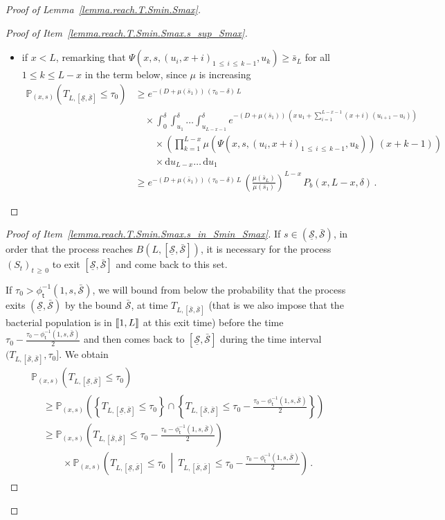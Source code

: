 \documentclass[AHL,Unicode,longabstracts,published]{cedram}
\newcommand{\llbracket}{\mathopen{[\mkern -2.7mu[}}
\newcommand{\rrbracket}{\mathclose{]\mkern -2.7mu]}}
\newcommand{\PP}{\mathbb{P}}
\newcommand{\dif}{\mathrm{d}}
\newcommand{\Smin}{\underline{\mathcal{S}}}
\newcommand{\Smax}{\bar{\mathcal{S}}}
\newcommand{\barmu}{\mu(\bar s_1)}
\newcommand{\phit}{\phi_\textsf{t}^{-1}}
\newcommand{\1}{\mathbf{1}}
\begin{document}
\begin{proof}[Proof of Lemma~\ref{lemma.reach.T.Smin.Smax}]
\begin{proof}[{Proof of Item~\eqref{lemma.reach.T.Smin.Smax.s_sup_Smax}}]
\begin{itemize}
\item if $x<L$, remarking that $\Psi(x,s,(u_i,x+i)_{1\,\leq\,i\,\leq\,k-1},u_k)\geq \bar s_L$ for all $1\leq k\leq L-x$ in the term below, since $\mu$ is increasing
\begin{align*}
\PP_{(x,s)}\left(T_{L, [\Smin,\Smax]}\leq \tau_0\right) &\geq e^{-(D+\barmu)\,(\tau_0-\delta)\,L}\,
\\
& \quad \times
\int_0^{\delta} \int_{u_1}^{\delta}\dots \int_{u_{L-x-1}}^{\delta} e^{-(D+\barmu)\,\left(x\,u_1+
\sum\limits_{i=1}^{L-x-1}(x+i)\,(u_{i+1}-u_{i})\right)}\,
\\
& \qquad \times
\left(\prod_{k=1}^{L-x}\mu\left(\Psi\left(x,s,(u_i,x+i)_{1\,\leq\,i\,\leq\,k-1},u_k\right)\right)\,(x+k-1)\right)
\,
\\
& \qquad \times
\dif u_{L-x}\dots\,\dif u_1
\\
&\geq e^{-(D+\barmu)\,(\tau_0-\delta)\,L}\,\left(\frac{\mu(\bar s_L)}{\barmu}\right)^{L-x}\, P_b(x,L-x, \delta)\,.
\end{align*}
\end{itemize}\let\qed\relax
\end{proof}

\begin{proof}[{Proof of Item~\eqref{lemma.reach.T.Smin.Smax.s_in_Smin_Smax}}]
If $s\in (\Smin,\Smax)$, in order that the process reaches $B(L,[\Smin,\Smax])$, it is necessary for the process $(S_t)_{t\,\geq\,0}$ to exit $[\Smin,\Smax]$ and come back to this set.

If $\tau_0>\phit(1, s,\Smax)$, we will bound from below the probability that the process exits $(\Smin,\Smax)$ by the bound $\Smax$, at time $T_{L,[\Smax,\Smax]}$ (that is we also impose that the bacterial population is in $\llbracket 1, L\rrbracket$ at this exit time) before the time $\tau_0-\frac{\tau_0-\phit(1, s,\Smax)}{2}$ and then comes back to $[\Smin,\Smax]$ during the time interval $(T_{L,[\Smax,\Smax]},\tau_0]$. We obtain
\begin{multline}\label{lemma.reachS.proba.decompo}
\PP_{(x,s)}\left(T_{L,[\Smin,\Smax]}\leq \tau_0\right)
\\
\begin{aligned}
&\geq
\PP_{(x,s)}\left(\left\{T_{L,[\Smin,\Smax]}\leq\tau_0\right\}
\cap \left\{T_{L,\left[\Smax,\Smax\right]}\leq \tau_0-\frac{\tau_0-\phit\left(1, s,\Smax\right)}{2}\right\}\right)
\\
&\geq
\PP_{(x,s)}\left(T_{L,\left[\Smax,\Smax\right]}\leq \tau_0-\frac{\tau_0-\phit\left(1, s,\Smax\right)}{2}\right)
\\
& \qquad\times
\PP_{(x,s)}\left(T_{L,\left[\Smin,\Smax\right]}\leq\tau_0\ \middle| \ T_{L,[\Smax,\Smax]}\leq \tau_0-\frac{\tau_0-\phit\left(1, s,\Smax\right)}{2} \right)\,.
\end{aligned}
\end{multline}


\end{proof}
\end{proof}
\end{document}
